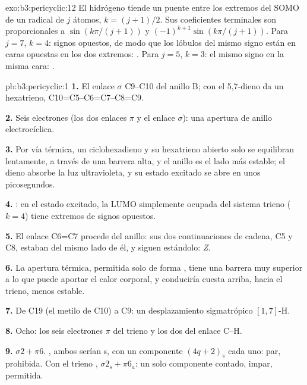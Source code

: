 \begin{solution}{exo:b3:pericyclic:12}
El hidrógeno tiende un puente entre los extremos del SOMO de un radical de $j$ átomos, $k = (j + 1)/2$. Sus coeficientes
terminales son proporcionales a $\sin(k\pi/(j + 1))$ y $(-1)^{k+1}\sin(k\pi/(j + 1))$. Para $j = 7$, $k = 4$: signos opuestos, de modo que
los lóbulos del mismo signo están en caras opuestas en los dos extremos: . Para
$j = 5$, $k = 3$: el mismo signo en la misma cara: .
\end{solution}

\begin{solution}{pb:b3:pericyclic:1}
\textbf{1.} El enlace $\sigma$ C9--C10 del anillo B; con el 5,7-dieno da un hexatrieno,
C10=C5--C6=C7--C8=C9.

\textbf{2.} Seis electrones (los dos enlaces $\pi$ y el enlace $\sigma$): una apertura de anillo electrocíclica.

\textbf{3.} Por vía térmica, un ciclohexadieno y su hexatrieno abierto solo se equilibran
lentamente, a través de una barrera alta, y el anillo es el lado más estable; el
dieno absorbe la luz ultravioleta, y su estado excitado se abre en unos
picosegundos.

\textbf{4.} : en el estado excitado, la LUMO simplemente ocupada del sistema
trieno ($k = 4$) tiene extremos de signos opuestos.

\textbf{5.} El enlace C6=C7 procede del anillo: sus dos continuaciones de cadena, C5 y C8,
estaban del mismo lado de él, y siguen estándolo: \textit{Z}.

\textbf{6.} La apertura térmica, permitida solo de forma , tiene una barrera muy superior a lo que
puede aportar el calor corporal, y conduciría cuesta arriba, hacia el trieno, menos estable.

\textbf{7.} De C19 (el metilo de C10) a C9: un desplazamiento sigmatrópico $[1,7]$-H.

\textbf{8.} Ocho: los seis electrones $\pi$ del trieno y los dos del enlace C--H.

\textbf{9.} $\sigma2 + \pi6$. , ambos serían s, con un componente $(4q + 2)_s$ cada uno:
par, prohibida. Con el trieno , $\sigma2_s + \pi6_a$: un solo componente contado, impar,
permitida.


\end{solution}
